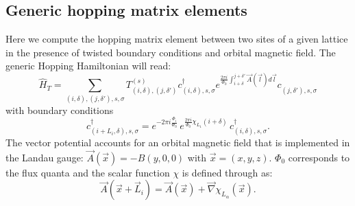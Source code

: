 %
\subsection{Generic hopping matrix elements}\label{sec:generic_hopping}


Here we compute the hopping matrix element  between two sites of a given lattice  in the presence of twisted boundary conditions and  orbital magnetic field. 
The generic Hopping Hamiltonian will read: 
\begin{equation}
	   \hat{H}_T = \sum_{(i,\delta), (j,\delta'), s, \sigma}    T_{(i,\delta), (j,\delta')}^{(s)}    c^{\dagger}_{(i,\delta),s,\sigma }   e^{\frac{2 \pi i}{\Phi_0} \int_{i + \delta}^{j + \delta'}  \vec{A}(\vec{l})  d \vec{l}} c^{}_{(j,\delta'),s,\sigma }
\end{equation}
with boundary conditions 
\begin{equation}
	c^{\dagger}_{(i + L_i,\delta) ,s,\sigma }   =  e^{- 2 \pi i\frac{\Phi_i}{\Phi_0}} \, e^{\frac{2 \pi i }{\Phi_0} \chi_{L_1} ( i + \delta ) } \, c^{\dagger}_{(i,\delta) ,s,\sigma }.
\end{equation}
The vector potential accounts for an orbital magnetic field that is implemented  in the Landau  gauge:  $\vec{A}(\vec{x})  =  -B(y,0,0) $ with $ \vec{x} = (x,y,z)$. $\Phi_0$ corresponds to the flux  quanta and the scalar function $\chi$ is defined  through as:
\begin{equation}
	\vec{A}( \vec{x} + \vec{L}_{i} )  = \vec{A}( \vec{x} )   +  \vec{\nabla} \chi_{L_{\alpha}}(\vec{x}). 
\end{equation}

